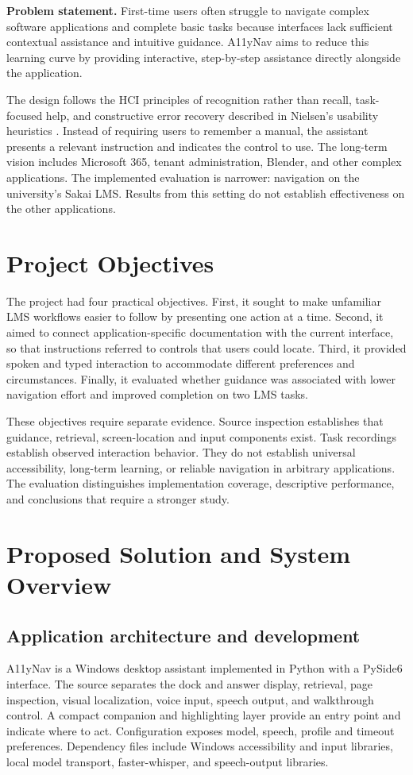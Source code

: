 \documentclass[11pt,a4paper]{article}
\begin{document}
\textbf{Problem statement.} First-time users often struggle to navigate complex software applications and complete basic tasks because interfaces lack sufficient contextual assistance and intuitive guidance. A11yNav aims to reduce this learning curve by providing interactive, step-by-step assistance directly alongside the application.

The design follows the HCI principles of recognition rather than recall, task-focused help, and constructive error recovery described in Nielsen's usability heuristics \cite{nielsen}. Instead of requiring users to remember a manual, the assistant presents a relevant instruction and indicates the control to use. The long-term vision includes Microsoft 365, tenant administration, Blender, and other complex applications. The implemented evaluation is narrower: navigation on the university's Sakai LMS. Results from this setting do not establish effectiveness on the other applications.

\section{Project Objectives}
The project had four practical objectives. First, it sought to make unfamiliar LMS workflows easier to follow by presenting one action at a time. Second, it aimed to connect application-specific documentation with the current interface, so that instructions referred to controls that users could locate. Third, it provided spoken and typed interaction to accommodate different preferences and circumstances. Finally, it evaluated whether guidance was associated with lower navigation effort and improved completion on two LMS tasks.

These objectives require separate evidence. Source inspection establishes that guidance, retrieval, screen-location and input components exist. Task recordings establish observed interaction behavior. They do not establish universal accessibility, long-term learning, or reliable navigation in arbitrary applications. The evaluation distinguishes implementation coverage, descriptive performance, and conclusions that require a stronger study.

\section{Proposed Solution and System Overview}
\subsection{Application architecture and development}
A11yNav is a Windows desktop assistant implemented in Python with a PySide6 interface. The source separates the dock and answer display, retrieval, page inspection, visual localization, voice input, speech output, and walkthrough control. A compact companion and highlighting layer provide an entry point and indicate where to act. Configuration exposes model, speech, profile and timeout preferences. Dependency files include Windows accessibility and input libraries, local model transport, faster-whisper, and speech-output libraries.
\end{document}
